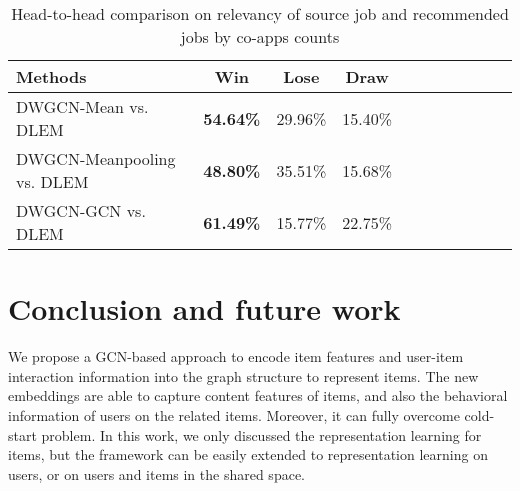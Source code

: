 \documentclass[manuscript,screen,review]{acmart}
\begin{document}
\begin{table}[t]
  \caption{Head-to-head comparison on relevancy of source job and recommended jobs by co-apps counts}
  \label{tab:comp}
  \begin{tabular}{lcccccccccc}
    \toprule
    Methods & Win & Lose & Draw \\
    \midrule
    DWGCN-Mean vs. DLEM& \textbf{54.64\%} & 29.96\% & 15.40\%\\
    DWGCN-Meanpooling vs. DLEM& \textbf{48.80\%} & 35.51\% & 15.68\%\\
    DWGCN-GCN vs. DLEM & \textbf{61.49\%} & 15.77\% & 22.75\%\\
  \bottomrule
\end{tabular}
\end{table}
 

\section{Conclusion and future work}
We propose a GCN-based approach to encode item features and user-item interaction information into the graph structure to represent items. The new embeddings are able to capture content features of items, and also the behavioral information of users on the related items. Moreover, it can fully overcome cold-start problem. In this work, we only discussed the representation learning for items, but the framework can be easily extended to representation learning on users, or on users and items in the shared space. 





\appendix
\end{document}
